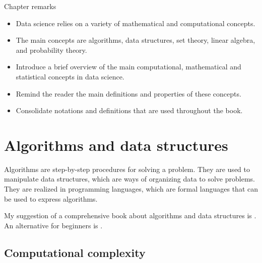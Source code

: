 \begin{mainbox}{Chapter remarks}


  \startcontents[chapters]
  \vspace{1em}


  \begin{itemize}
    \item Data science relies on a variety of mathematical and computational concepts.
    \item The main concepts are algorithms, data structures, set theory, linear algebra,
      and probability theory.
  \end{itemize}


  \begin{itemize}
    \item Introduce a brief overview of the main computational, mathematical and
      statistical concepts in data science.
    \item Remind the reader the main definitions and properties of these concepts.
    \item Consolidate notations and definitions that are used throughout the book.
  \end{itemize}
\end{mainbox}

{}
\clearpage

\section{Algorithms and data structures}

Algorithms are step-by-step procedures for solving a problem.  They are used to
manipulate data structures, which are ways of organizing data to solve problems.
They are realized in programming languages, which are formal languages that can be used
to express algorithms.

My suggestion of a comprehensive book about algorithms and data structures is
\textcite{Cormen2022}.  An alternative for beginners is
\textcite{Guttag2021}.

\subsection{Computational complexity}

